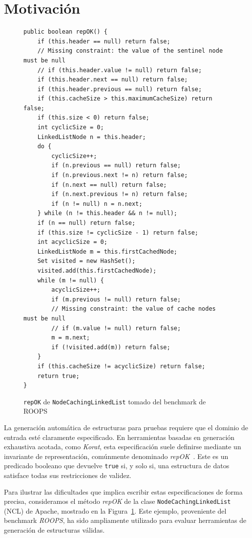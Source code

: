 \section[Motivación]{Motivación}
\label{sec:motivating-example}


\begin{figure}[!thb]
\begin{lstlisting}
public boolean repOK() {
    if (this.header == null) return false;
    // Missing constraint: the value of the sentinel node must be null  
    // if (this.header.value != null) return false;
    if (this.header.next == null) return false;
    if (this.header.previous == null) return false;
    if (this.cacheSize > this.maximumCacheSize) return false;
    if (this.size < 0) return false;
    int cyclicSize = 0;
    LinkedListNode n = this.header;
    do {
        cyclicSize++;
        if (n.previous == null) return false;
        if (n.previous.next != n) return false;
        if (n.next == null) return false;
        if (n.next.previous != n) return false;
        if (n != null) n = n.next;
    } while (n != this.header && n != null);
    if (n == null) return false;
    if (this.size != cyclicSize - 1) return false;
    int acyclicSize = 0;
    LinkedListNode m = this.firstCachedNode;
    Set visited = new HashSet();
    visited.add(this.firstCachedNode);
    while (m != null) {
        acyclicSize++;
        if (m.previous != null) return false;
        // Missing constraint: the value of cache nodes must be null
        // if (m.value != null) return false;
        m = m.next;
        if (!visited.add(m)) return false;
    }
    if (this.cacheSize != acyclicSize) return false;
    return true;
}
\end{lstlisting}
\caption{\texttt{repOK} de \texttt{NodeCachingLinkedList} tomado del benchmark de \textsf{ROOPS}}
\label{fig:NCL-repOK}
\end{figure}


La generación automática de estructuras para pruebas requiere que el dominio de entrada esté claramente especificado. 
En herramientas basadas en generación exhaustiva acotada, como \emph{Korat}, esta especificación suele definirse mediante 
un invariante de representación, comúnmente denominado \emph{repOK}~\cite{Boyapati02}. Este es un predicado booleano 
que devuelve \texttt{true} si, y solo si, una estructura de datos satisface todas sus restricciones de validez.


Para ilustrar las dificultades que implica escribir estas especificaciones de forma precisa, consideramos el método 
\emph{repOK} de la clase \texttt{NodeCachingLinkedList} (NCL) de Apache, mostrado en la Figura~\ref{fig:NCL-repOK}. 
Este ejemplo, proveniente del benchmark \emph{ROOPS}, ha sido ampliamente utilizado para evaluar herramientas de generación 
de estructuras válidas.

